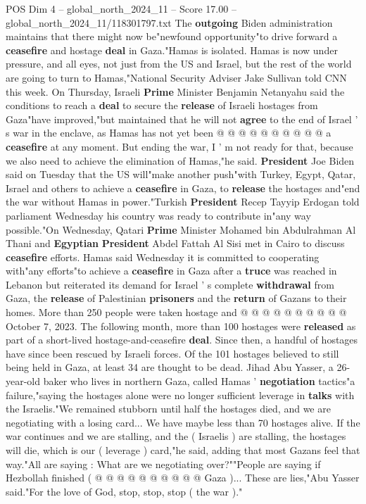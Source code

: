 \begin{textsample}{POS Dim 4 – global\_north\_2024\_11 – Score 17.00 – global\_north\_2024\_11/118301797.txt}
The \textbf{outgoing} Biden administration maintains that there might now be"newfound opportunity"to drive forward a \textbf{ceasefire} and hostage \textbf{deal} in Gaza."Hamas is isolated.
Hamas is now under pressure, and all eyes, not just from the US and Israel, but the rest of the world are going to turn to Hamas,"National Security Adviser Jake Sullivan told CNN this week.
On Thursday, Israeli \textbf{Prime} Minister Benjamin Netanyahu said the conditions to reach a \textbf{deal} to secure the \textbf{release} of Israeli hostages from Gaza"have improved,"but maintained that he will not \textbf{agree} to the end of Israel ' s war in the enclave, as Hamas has not yet been @ @ @ @ @ @ @ @ @ @ a \textbf{ceasefire} at any moment.
But ending the war, I ' m not ready for that, because we also need to achieve the elimination of Hamas,"he said. \textbf{President} Joe Biden said on Tuesday that the US will"make another push"with Turkey, Egypt, Qatar, Israel and others to achieve a \textbf{ceasefire} in Gaza, to \textbf{release} the hostages and"end the war without Hamas in power."Turkish \textbf{President} Recep Tayyip Erdogan told parliament Wednesday his country was ready to contribute in"any way possible."On Wednesday, Qatari \textbf{Prime} Minister Mohamed bin Abdulrahman Al Thani and \textbf{Egyptian} \textbf{President} Abdel Fattah Al Sisi met in Cairo to discuss \textbf{ceasefire} efforts.
Hamas said Wednesday it is committed to cooperating with"any efforts"to achieve a \textbf{ceasefire} in Gaza after a \textbf{truce} was reached in Lebanon but reiterated its demand for Israel ' s complete \textbf{withdrawal} from Gaza, the \textbf{release} of Palestinian \textbf{prisoners} and the \textbf{return} of Gazans to their homes.
More than 250 people were taken hostage and @ @ @ @ @ @ @ @ @ @ October 7, 2023.
The following month, more than 100 hostages were \textbf{released} as part of a short-lived hostage-and-ceasefire \textbf{deal}.
Since then, a handful of hostages have since been rescued by Israeli forces.
Of the 101 hostages believed to still being held in Gaza, at least 34 are thought to be dead.
Jihad Abu Yasser, a 26-year-old baker who lives in northern Gaza, called Hamas ' \textbf{negotiation} tactics"a failure,"saying the hostages alone were no longer sufficient leverage in \textbf{talks} with the Israelis."We remained stubborn until half the hostages died, and we are negotiating with a losing card...
We have maybe less than 70 hostages alive.
If the war continues and we are stalling, and the ( Israelis ) are stalling, the hostages will die, which is our ( leverage ) card,"he said, adding that most Gazans feel that way."All are saying : What are we negotiating over?""People are saying if Hezbollah finished ( @ @ @ @ @ @ @ @ @ @ Gaza )...
These are lies,"Abu Yasser said."For the love of God, stop, stop, stop ( the war )."

\end{textsample}
